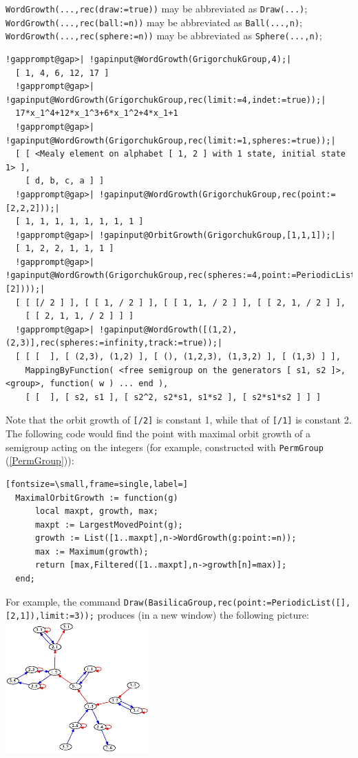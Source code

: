 \documentclass[a4paper,11pt]{report}
\begin{document}
{{{ \texttt{WordGrowth(...,rec(draw:=true))} may be abbreviated as \texttt{Draw(...)}; \texttt{WordGrowth(...,rec(ball:=n))} may be abbreviated as \texttt{Ball(...,n)}; \texttt{WordGrowth(...,rec(sphere:=n))} may be abbreviated as \texttt{Sphere(...,n)}; 
\begin{Verbatim}[commandchars=!@|,fontsize=\small,frame=single,label=Example]
  !gapprompt@gap>| !gapinput@WordGrowth(GrigorchukGroup,4);|
  [ 1, 4, 6, 12, 17 ]
  !gapprompt@gap>| !gapinput@WordGrowth(GrigorchukGroup,rec(limit:=4,indet:=true));|
  17*x_1^4+12*x_1^3+6*x_1^2+4*x_1+1
  !gapprompt@gap>| !gapinput@WordGrowth(GrigorchukGroup,rec(limit:=1,spheres:=true));|
  [ [ <Mealy element on alphabet [ 1, 2 ] with 1 state, initial state 1> ],
    [ d, b, c, a ] ]
  !gapprompt@gap>| !gapinput@WordGrowth(GrigorchukGroup,rec(point:=[2,2,2]));|
  [ 1, 1, 1, 1, 1, 1, 1, 1 ]
  !gapprompt@gap>| !gapinput@OrbitGrowth(GrigorchukGroup,[1,1,1]);|
  [ 1, 2, 2, 1, 1, 1 ]
  !gapprompt@gap>| !gapinput@WordGrowth(GrigorchukGroup,rec(spheres:=4,point:=PeriodicList([],[2])));|
  [ [ [/ 2 ] ], [ [ 1, / 2 ] ], [ [ 1, 1, / 2 ] ], [ [ 2, 1, / 2 ] ],
    [ [ 2, 1, 1, / 2 ] ] ]
  !gapprompt@gap>| !gapinput@WordGrowth([(1,2),(2,3)],rec(spheres:=infinity,track:=true));|
  [ [ [  ], [ (2,3), (1,2) ], [ (), (1,2,3), (1,3,2) ], [ (1,3) ] ],
    MappingByFunction( <free semigroup on the generators [ s1, s2 ]>, <group>, function( w ) ... end ),
    [ [  ], [ s2, s1 ], [ s2^2, s2*s1, s1*s2 ], [ s2*s1*s2 ] ] ]
\end{Verbatim}
 Note that the orbit growth of \texttt{[/2]} is constant 1, while that of \texttt{[/1]} is constant 2. The following code would find the point with maximal orbit
growth of a semigroup acting on the integers (for example, constructed with \texttt{PermGroup} (\ref{PermGroup})): 
\begin{Verbatim}[fontsize=\small,frame=single,label=]
  MaximalOrbitGrowth := function(g)
      local maxpt, growth, max;
      maxpt := LargestMovedPoint(g);
      growth := List([1..maxpt],n->WordGrowth(g:point:=n));
      max := Maximum(growth);
      return [max,Filtered([1..maxpt],n->growth[n]=max)];
  end;
\end{Verbatim}
 

 For example, the command \texttt{Draw(BasilicaGroup,rec(point:=PeriodicList([],[2,1]),limit:=3));} produces (in a new window) the following picture:  \includegraphics[height=5cm,keepaspectratio=true]{basilica-ball.jpg}   }

}}
\end{document}
